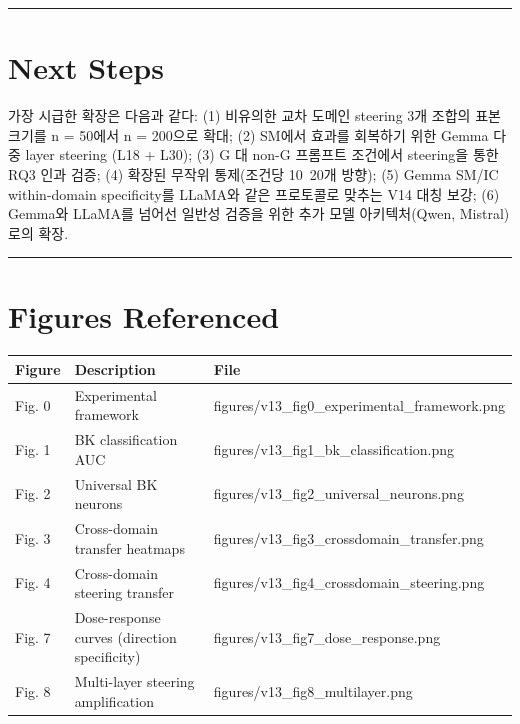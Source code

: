 \documentclass[11pt,a4paper]{article}
\begin{document}
\bigskip\hrule\bigskip

\section{Next Steps}

가장 시급한 확장은 다음과 같다: (1) 비유의한 교차 도메인 steering 3개 조합의 표본 크기를 n = 50에서 n = 200으로 확대; (2) SM에서 효과를 회복하기 위한 Gemma 다중 layer steering (L18 + L30); (3) G 대 non-G 프롬프트 조건에서 steering을 통한 RQ3 인과 검증; (4) 확장된 무작위 통제(조건당 10~20개 방향); (5) Gemma SM/IC within-domain specificity를 LLaMA와 같은 프로토콜로 맞추는 V14 대칭 보강; (6) Gemma와 LLaMA를 넘어선 일반성 검증을 위한 추가 모델 아키텍처(Qwen, Mistral)로의 확장.

\bigskip\hrule\bigskip

\section{Figures Referenced}

\begin{table}[H]
\centering
\small
\begin{tabular}{|l|l|l|}
\hline
Figure & Description & File \\
\hline
Fig. 0 & Experimental framework & figures/v13\_fig0\_experimental\_framework.png \\
Fig. 1 & BK classification AUC & figures/v13\_fig1\_bk\_classification.png \\
Fig. 2 & Universal BK neurons & figures/v13\_fig2\_universal\_neurons.png \\
Fig. 3 & Cross-domain transfer heatmaps & figures/v13\_fig3\_crossdomain\_transfer.png \\
Fig. 4 & Cross-domain steering transfer & figures/v13\_fig4\_crossdomain\_steering.png \\
Fig. 7 & Dose-response curves (direction specificity) & figures/v13\_fig7\_dose\_response.png \\
Fig. 8 & Multi-layer steering amplification & figures/v13\_fig8\_multilayer.png \\
\hline
\end{tabular}
\end{table}
\end{document}
